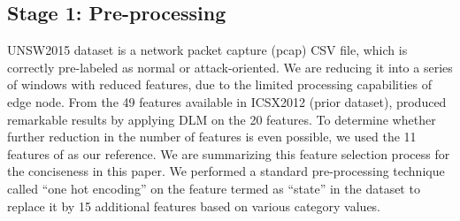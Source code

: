 \documentclass[conference]{IEEEtran}
\begin{document}
\iffalse
\begin{figure*}
    \centering
    \subfigure[Collating multiple packets into a single window with feature reduction. The \textit{y}-label in each packet shows either normal behavior or DDoS attack which is represented by 0 or 1 value, respectively. The label of the final \textit{T}-th packet represents the label of entire window to show that the sequence of all the past packets have led to the attack.]
    {
        \texttt{[image: images/Single-Window-Creation-Process-with-labels.png]}
       \label{fig:single_window}
    }
    \subfigure[Input data transformation for UNSW-2015 dataset into window sequences using sliding window approach for RNN model training. Each window is created using the procedure shown in Figure~\ref{fig:single_window}]
    {
        \texttt{[image: images/Data-Transformation-with-labels.png]}
}
    \caption{Input transformation for single window and entire dataset from packets into windows to learn about network patterns.}
    \label{fig:data_transformation}
\end{figure*}
\fi


\subsection{Stage 1: Pre-processing} \label{Sec:dataset_transformation}

\noindent UNSW2015 dataset is a network packet capture (pcap) CSV file, which is correctly pre-labeled as normal or attack-oriented. We are reducing it into a series of windows with reduced features, due to the limited processing capabilities of edge node. From the 49 features available in ICSX2012 (prior dataset), \cite{yuan2017deepdefense} produced remarkable results by applying DLM on the 20 features. 
To determine whether further reduction in the number of features is even possible, we used the 11 features of \cite{moustafa2017hybrid} as our reference. We are summarizing this feature selection process for the conciseness in this paper.
We performed a standard pre-processing technique called ``one hot encoding'' on the feature termed as ``state'' in the dataset to replace it by 15 additional features based on various category values. 
\end{document}
